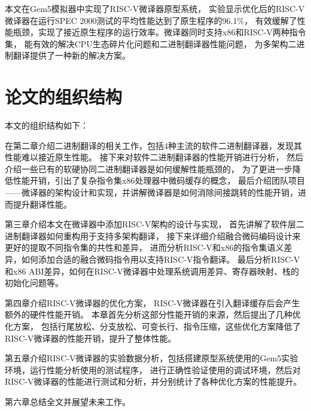 本文在Gem5模拟器中实现了RISC-V微译器原型系统，
实验显示优化后的RISC-V微译器在运行SPEC 2000测试的平均性能达到了原生程序的96.1\%，
有效缓解了性能瓶颈，实现了接近原生程序的运行效率。微译器同时支持x86和RISC-V两种指令集，
能有效的解决CPU生态碎片化问题和二进制翻译器性能问题，
为多架构二进制翻译提供了一种新的解决方案。

\section{论文的组织结构}

本文的组织结构如下：

在第二章介绍二进制翻译的相关工作，包括4种主流的软件二进制翻译器，发现其性能难以接近原生性能。
接下来对软件二进制翻译器的性能开销进行分析，
然后介绍一些已有的软硬协同二进制翻译器是如何缓解性能瓶颈的，
为了更进一步降低性能开销，引出了复杂指令集x86处理器中微码缓存的概念，
最后介绍团队项目——微译器的架构设计和实现，并讲解微译器是如何消除间接跳转的性能开销，进而提升翻译性能。

第三章介绍本文在微译器中添加RISC-V架构的设计与实现，
首先讲解了软件层二进制翻译器如何重构用于支持多架构翻译，
接下来详细介绍融合微码编码设计来更好的提取不同指令集的共性和差异，
进而分析RISC-V和x86的指令集语义差异，如何添加合适的融合微码指令用以支持RISC-V指令翻译。
最后分析RISC-V和x86 ABI差异，如何在RISC-V微译器中处理系统调用差异、寄存器映射、栈的初始化问题等。

第四章介绍RISC-V微译器的优化方案，
RISC-V微译器在引入翻译缓存后会产生额外的硬件性能开销。
本章首先分析这部分性能开销的来源，然后提出了几种优化方案，
包括行尾放松、分支放松、可变长行、指令压缩，这些优化方案降低了RISC-V微译器的性能开销，提升了整体性能。

第五章介绍RISC-V微译器的实验数据分析，包括搭建原型系统使用的Gem5实验环境，运行性能分析使用的测试程序，
进行正确性验证使用的调试环境，然后对RISC-V微译器的性能进行测试和分析，并分别统计了各种优化方案的性能提升。

第六章总结全文并展望未来工作。

